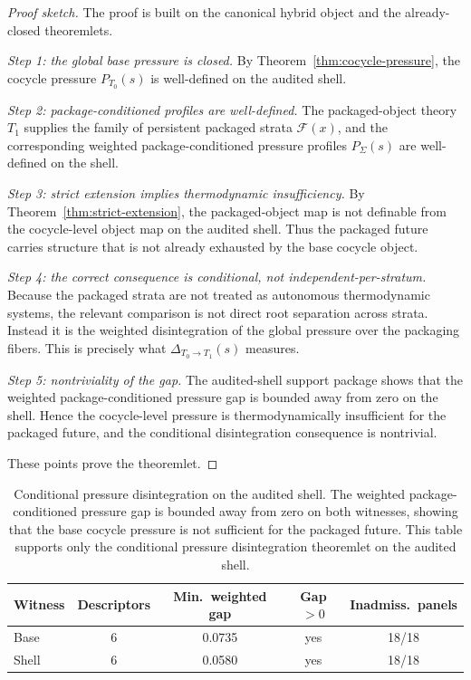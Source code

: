 \documentclass[11pt]{article}
\theoremstyle{definition}
\newcommand{\Tzero}{T_0}
\newcommand{\Tone}{T_1}
\begin{document}
\begin{proof}[Proof sketch]
The proof is built on the canonical hybrid object and the already-closed theoremlets.

\smallskip
\noindent\emph{Step 1: the global base pressure is closed.}
By Theorem~\ref{thm:cocycle-pressure}, the cocycle pressure \(P_{\Tzero}(s)\) is well-defined on the audited shell.

\smallskip
\noindent\emph{Step 2: package-conditioned profiles are well-defined.}
The packaged-object theory \(\Tone\) supplies the family of persistent packaged strata \(\mathcal{F}(x)\), and the corresponding weighted package-conditioned pressure profiles \(P_{\Sigma}(s)\) are well-defined on the shell.

\smallskip
\noindent\emph{Step 3: strict extension implies thermodynamic insufficiency.}
By Theorem~\ref{thm:strict-extension}, the packaged-object map is not definable from the cocycle-level object map on the audited shell. Thus the packaged future carries structure that is not already exhausted by the base cocycle object.

\smallskip
\noindent\emph{Step 4: the correct consequence is conditional, not independent-per-stratum.}
Because the packaged strata are not treated as autonomous thermodynamic systems, the relevant comparison is not direct root separation across strata. Instead it is the weighted disintegration of the global pressure over the packaging fibers. This is precisely what \(\Delta_{\Tzero\to \Tone}(s)\) measures.

\smallskip
\noindent\emph{Step 5: nontriviality of the gap.}
The audited-shell support package shows that the weighted package-conditioned pressure gap is bounded away from zero on the shell. Hence the cocycle-level pressure is thermodynamically insufficient for the packaged future, and the conditional disintegration consequence is nontrivial.

These points prove the theoremlet.
\end{proof}

\begin{table}[t]
\caption{Conditional pressure disintegration on the audited shell.
The weighted package-conditioned pressure gap is bounded away from zero
on both witnesses, showing that the base cocycle pressure is not sufficient
for the packaged future.
This table supports only the conditional pressure disintegration
theoremlet on the audited shell.}
\label{tbl:conditional-disintegration}
\centering
\small
\begin{tabular}{@{}l c c c c@{}}
\toprule
Witness & Descriptors & Min.\ weighted gap & Gap $>0$ & Inadmiss.\ panels \\
\midrule
Base  & 6 & 0.0735 & yes & 18/18 \\
Shell & 6 & 0.0580 & yes & 18/18 \\
\bottomrule
\end{tabular}
\end{table}
 
\end{document}
